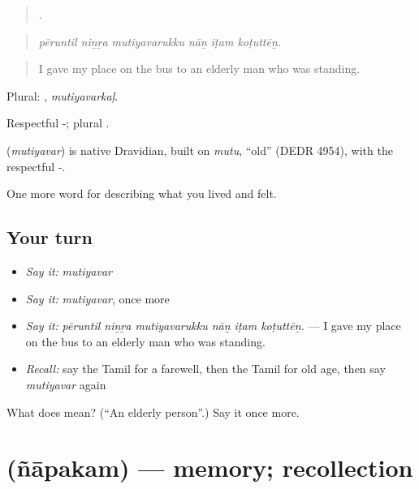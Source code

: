 \begin{quote}
     .
\end{quote}

\begin{quote}
\emph{pēruntil niṉṟa mutiyavarukku nāṉ iṭam koṭuttēṉ.}
\end{quote}

\begin{quote}
I gave my place on the bus to an elderly man who was standing.
\end{quote}

Plural: , \emph{mutiyavarkaḷ}.

Respectful -; plural .

\begin{cousinweb}
\textbf{} (\emph{mutiyavar}) is native Dravidian, built on  \emph{mutu}, \textquotedblleft{}old\textquotedblright{} (DEDR 4954), with the respectful -.
\end{cousinweb}

\begin{grammarlens}[title={What you've built}]
One more word for describing what you lived and felt.
\end{grammarlens}

\subsection*{Your turn}
\begin{itemize}
\raggedright
  \item \emph{Say it:} \emph{mutiyavar}
  \item \emph{Say it:} \emph{mutiyavar}, once more
  \item \emph{Say it:} \emph{pēruntil niṉṟa mutiyavarukku nāṉ iṭam koṭuttēṉ.} — I gave my place on the bus to an elderly man who was standing.
  \item \emph{Recall:} say the Tamil for a farewell, then the Tamil for old age, then say \emph{mutiyavar} again
\end{itemize}

\begin{tcolorbox}[breakable,colback=teal!4,colframe=teal!35!black,title={Before you move on}]
What does  mean? (\textquotedblleft{}An elderly person\textquotedblright{}.) Say it once more.
\end{tcolorbox}
\section[\texorpdfstring{\ta{ஞாபகம்} (ñāpakam)}{ஞாபகம் (ñāpakam)}]{ (ñāpakam) — memory; recollection}


